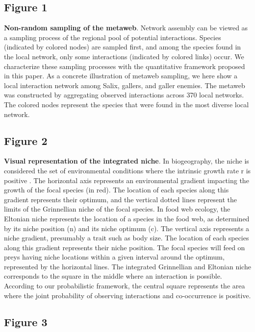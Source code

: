 \documentclass[12pt]{article}
\begin{document}
\subsection*{Figure 1}

\textbf{Non-random sampling of the metaweb}.  Network assembly can be viewed
as a sampling process of the regional pool of potential interactions. Species
(indicated by colored nodes) are sampled first, and among the species found in
the local network, only some interactions (indicated by colored links) occur.
We characterize these sampling processes with the quantitative framework
proposed in this paper. As a concrete illustration of metaweb sampling, we
here show a local interaction network among Salix, gallers, and galler
enemies. The metaweb was constructed by aggregating observed interactions
across 370 local networks. The colored nodes represent the species that were
found in the most diverse local network.

\subsection*{Figure 2}

\textbf{Visual representation of the integrated niche}.  In biogeography, the
niche is considered the set of environmental conditions where the intrinsic
growth rate r is positive \citep{Holt2009}. The horizontal axis represents an
environmental gradient impacting the growth of the focal species (in red). The
location of each species along this gradient represents their optimum, and the
vertical dotted lines represent the limits of the Grinnellian niche of the
focal species. In food web ecology, the Eltonian niche represents the location
of a species in the food web, as determined by its niche position (n) and its
niche optimum (c). The vertical axis represents a niche gradient, presumably a
trait such as body size. The location of each species along this gradient
represents their niche position. The focal species will feed on preys having
niche locations within a given interval around the optimum, represented by the
horizontal lines. The integrated Grinnellian and Eltonian niche corresponds to
the square in the middle where an interaction is possible. According to our
probabilistic framework, the central square represents the area where the
joint probability of observing interactions and co-occurrence is positive.


\subsection*{Figure 3}
\end{document}
